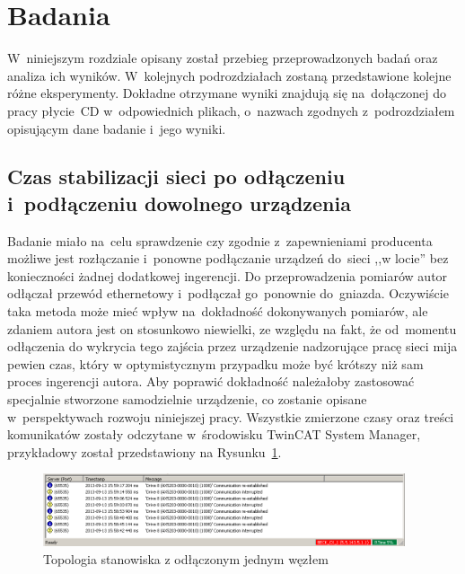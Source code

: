 \section{Badania}
W~niniejszym rozdziale opisany został przebieg przeprowadzonych badań oraz analiza ich wyników. W~kolejnych podrozdziałach zostaną przedstawione kolejne różne eksperymenty. Dokładne otrzymane wyniki znajdują się na~dołączonej do pracy płycie~CD w~odpowiednich plikach, o~nazwach zgodnych z~podrozdziałem opisującym dane badanie i~jego wyniki.

\subsection{Czas stabilizacji sieci po odłączeniu i~podłączeniu dowolnego urządzenia}
Badanie miało na~celu sprawdzenie czy zgodnie z~zapewnieniami producenta możliwe jest rozłączanie i~ponowne podłączanie urządzeń do~sieci ,,w locie'' bez konieczności żadnej dodatkowej ingerencji. Do przeprowadzenia pomiarów autor odłączał przewód ethernetowy i~podłączał go~ponownie do~gniazda. Oczywiście taka metoda może mieć wpływ na~dokładność dokonywanych pomiarów, ale zdaniem autora jest on stosunkowo niewielki, ze względu na fakt, że od~momentu odłączenia do wykrycia tego zajścia przez urządzenie nadzorujące pracę sieci mija pewien czas, który w optymistycznym przypadku może być krótszy niż sam proces ingerencji autora. Aby poprawić dokładność należałoby zastosować specjalnie stworzone samodzielnie urządzenie, co zostanie opisane w~perspektywach rozwoju niniejszej pracy. Wszystkie zmierzone czasy oraz treści komunikatów zostały odczytane w~środowisku TwinCAT System Manager, przykładowy został przedstawiony na Rysunku~\ref{reading_time}.

\begin{figure}[!htb] 	\centering 	\includegraphics[width=0.95\textwidth]{images/reading_time} \caption{Topologia stanowiska z odłączonym jednym węzłem} \label{reading_time} \end{figure}
\vspace{-5mm}
